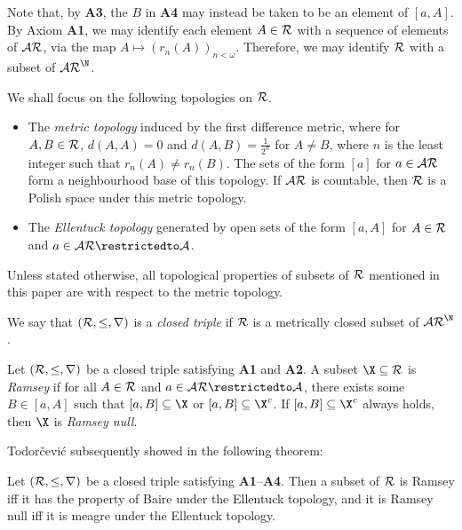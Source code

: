 \documentclass[11pt,reqno]{amsart}
\begin{document}
Note that, by \textbf{A3}, the $B$ in \textbf{A4} may instead be taken to be an element of $[a,A]$. By Axiom \textbf{A1}, we may identify each element $A \in \cal{R}$ with a sequence of elements of $\cal{AR}$, via the map $A \mapsto (r_n(A))_{n<\omega}$. Therefore, we may identify $\cal{R}$ with a subset of $\cal{AR}^\N$.

We shall focus on the following topologies on $\cal{R}$.
\begin{itemize}
    \item The \emph{metric topology} induced by the first difference metric, where for $A,B \in \cal{R}$, $d(A,A) = 0$ and $d(A,B) = \frac{1}{2^n}$ for $A \neq B$, where $n$ is the least integer such that $r_n(A) \neq r_n(B)$. The sets of the form $[a]$ for $a \in \cal{AR}$ form a neighbourhood base of this topology. If $\cal{AR}$ is countable, then $\cal{R}$ is a Polish space under this metric topology.

    \item The \emph{Ellentuck topology} generated by open sets of the form $[a,A]$ for $A \in \cal{R}$ and $a \in \cal{AR}\restrictedto A$.
\end{itemize}
Unless stated otherwise, all topological properties of subsets of $\cal{R}$ mentioned in this paper are with respect to the metric topology.

\begin{definition}
    We say that $(\cal{R},\leq,r)$ is a \emph{closed triple} if $\cal{R}$ is a metrically closed subset of $\cal{AR}^\N$.
\end{definition}

\begin{definition}
    Let $(\cal{R},\leq,r)$ be a closed triple satisfying \textbf{A1} and \textbf{A2}. A subset $\X \subseteq \cal{R}$ is \emph{Ramsey} if for all $A \in \cal{R}$ and $a \in \cal{AR}\restrictedto A$, there exists some $B \in [a,A]$ such that $[a,B] \subseteq \X$ or $[a,B] \subseteq \X^c$. If $[a,B] \subseteq \X^c$ always holds, then $\X$ is \emph{Ramsey null}.
\end{definition}

Todor\v{c}evi\'{c} subsequently showed in \cite{T10} the following theorem:

\begin{theorem}
\label{thm:abstract.Ellentuck.thm}
    Let $(\cal{R},\leq,r)$ be a closed triple satisfying \textbf{A1}--\textbf{A4}. Then a subset of $\cal{R}$ is Ramsey iff it has the property of Baire under the Ellentuck topology, and it is Ramsey null iff it is meagre under the Ellentuck topology. 
\end{theorem}
\end{document}
